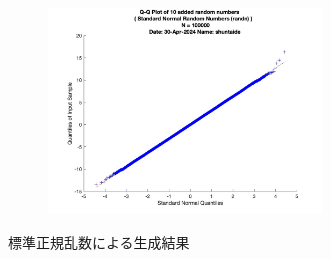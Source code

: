 \begin{figure}
\begin{subfigure}{0.48\linewidth}
		\label{fi:cl-standard-normal-added}
	\end{subfigure}
	\begin{subfigure}{0.48\linewidth}
		\centering
		\includegraphics[width=0.8\textwidth]{src/figures/cl-standard-normal/cl_added_randn_qqpl_N=100000.jpg}
		\label{fig:cl-standard-normal-added-qqpl}
	\end{subfigure}
	\caption{標準正規乱数による生成結果}\label{fig:cl-standard-normal-random}
\end{figure}
